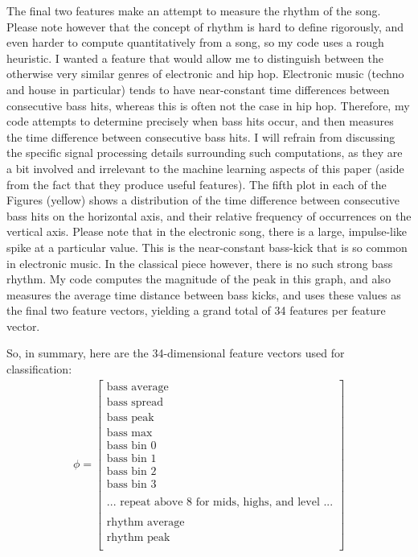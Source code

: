 \documentclass[aps,twocolumn,secnumarabic,balancelastpage,amsmath,amssymb,nofootinbib]{revtex4-1}
\begin{document}
The final two features make an attempt to measure the rhythm of the song. Please note however that the concept of rhythm is hard to define rigorously, and even harder to compute quantitatively from a song, so my code uses a rough heuristic. I wanted a feature that would allow me to distinguish between the otherwise very similar genres of electronic and hip hop. Electronic music (techno and house in particular) tends to have near-constant time differences between consecutive bass hits, whereas this is often not the case in hip hop. Therefore, my code attempts to determine precisely when bass hits occur, and then measures the time difference between consecutive bass hits. I will refrain from discussing the specific signal processing details surrounding such computations, as they are a bit involved and irrelevant to the machine learning aspects of this paper (aside from the fact that they produce useful features). The fifth plot in each of the Figures (yellow) shows a distribution of the time difference between consecutive bass hits on the horizontal axis, and their relative frequency of occurrences on the vertical axis. Please note that in the electronic song, there is a large, impulse-like spike at a particular value. This is the near-constant bass-kick that is so common in electronic music. In the classical piece however, there is no such strong bass rhythm. My code computes the magnitude of the peak in this graph, and also measures the average time distance between bass kicks, and uses these values as the final two feature vectors, yielding a grand total of 34 features per feature vector.

So, in summary, here are the 34-dimensional feature vectors used for classification:
\begin{align*}
\phi = \begin{bmatrix}
\text{bass average}	\\
\text{bass spread}	\\
\text{bass peak}	\\
\text{bass max}	\\
\text{bass bin 0}	\\
\text{bass bin 1}	\\
\text{bass bin 2}	\\
\text{bass bin 3}	\\ \\
\text{... repeat above 8 for mids, highs, and level ...} \\ \\
\text{rhythm average}	\\
\text{rhythm peak}	\\
\end{bmatrix}
\end{align*}
\end{document}
